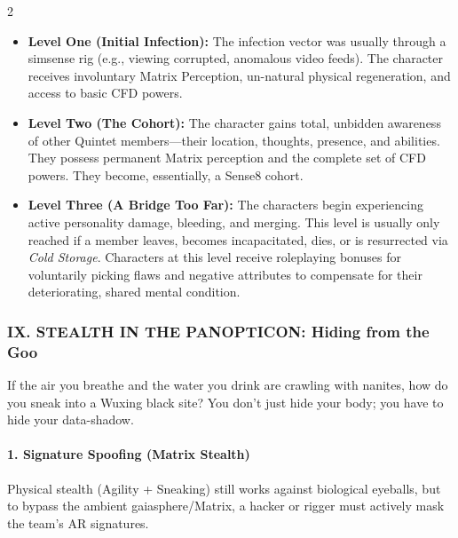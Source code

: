 \documentclass[
  oneside]{article}
\providecommand{\tightlist}{%
  \setlength{\itemsep}{0pt}\setlength{\parskip}{0pt}}
\begin{document}
\begin{multicols}{2}
\begin{itemize}
\tightlist
\item
  \textbf{Level One (Initial Infection):} The
  infection vector was usually through a simsense
  rig (e.g., viewing corrupted, anomalous video
  feeds). The character receives involuntary
  Matrix Perception, un-natural physical
  regeneration, and access to basic CFD powers.
\item
  \textbf{Level Two (The Cohort):} The character
  gains total, unbidden awareness of other Quintet
  members---their location, thoughts, presence,
  and abilities. They possess permanent Matrix
  perception and the complete set of CFD powers.
  They become, essentially, a Sense8 cohort.
\item
  \textbf{Level Three (A Bridge Too Far):} The
  characters begin experiencing active personality
  damage, bleeding, and merging. This level is
  usually only reached if a member leaves, becomes
  incapacitated, dies, or is resurrected via
  \emph{Cold Storage}. Characters at this level
  receive roleplaying bonuses for voluntarily
  picking flaws and negative attributes to
  compensate for their deteriorating, shared
  mental condition.
\end{itemize}

\hypertarget{ix.-stealth-in-the-panopticon-hiding-from-the-goo}{%
\subsubsection{IX. STEALTH IN THE PANOPTICON:
Hiding from the
Goo}\label{ix.-stealth-in-the-panopticon-hiding-from-the-goo}}

If the air you breathe and the water you drink are
crawling with nanites, how do you sneak into a
Wuxing black site? You don't just hide your body;
you have to hide your data-shadow.

\hypertarget{signature-spoofing-matrix-stealth}{%
\paragraph{1. Signature Spoofing (Matrix
Stealth)}\label{signature-spoofing-matrix-stealth}}

Physical stealth (Agility + Sneaking) still works
against biological eyeballs, but to bypass the
ambient gaiasphere/Matrix, a hacker or rigger must
actively mask the team's AR signatures.


\end{multicols}
\end{document}
